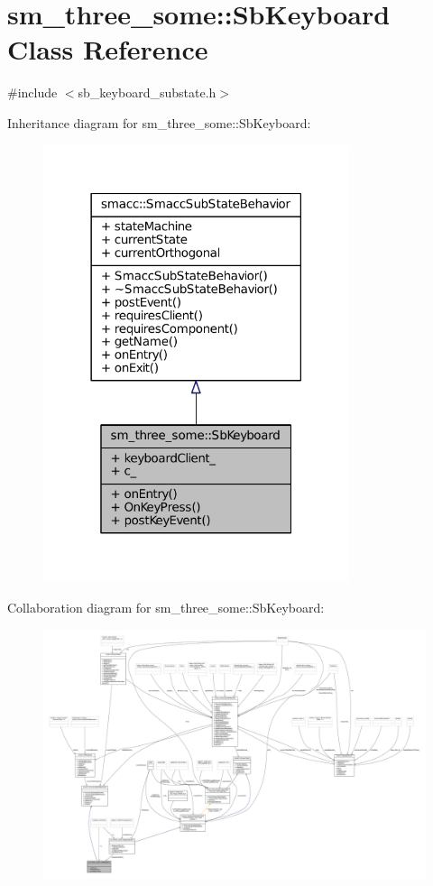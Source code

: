 \hypertarget{classsm__three__some_1_1SbKeyboard}{}\section{sm\+\_\+three\+\_\+some\+:\+:Sb\+Keyboard Class Reference}
\label{classsm__three__some_1_1SbKeyboard}


{\ttfamily \#include $<$sb\+\_\+keyboard\+\_\+substate.\+h$>$}



Inheritance diagram for sm\+\_\+three\+\_\+some\+:\+:Sb\+Keyboard\+:
\nopagebreak
\begin{figure}[H]
\begin{center}
\leavevmode
\includegraphics[width=254pt]{classsm__three__some_1_1SbKeyboard__inherit__graph}
\end{center}
\end{figure}


Collaboration diagram for sm\+\_\+three\+\_\+some\+:\+:Sb\+Keyboard\+:
\nopagebreak
\begin{figure}[H]
\begin{center}
\leavevmode
\includegraphics[width=350pt]{classsm__three__some_1_1SbKeyboard__coll__graph}
\end{center}
\end{figure}
